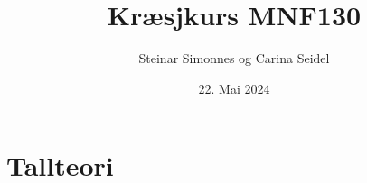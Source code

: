 \documentclass[aspectratio=169,fleqn,handout,xcolor={dvipsnames}]{beamer}
\author[ls]{Steinar Simonnes og Carina Seidel}
\title[sgp]{Kræsjkurs MNF130}
\institute{Institutt for Informatikk \\ Universitetet i Bergen}
\date[22.05.24]{22. Mai 2024}
\begin{document}


% 
% 
% 

% 
% 
% 

% 
% 
% 
% 

% 
% 
% 
% 
% 

\section{Tallteori}





% 
% 
% 

% 
% 
% 
\end{document}
